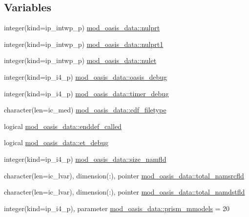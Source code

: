 \subsection*{Variables}
\begin{DoxyCompactItemize}
\item 
integer(kind=ip\+\_\+intwp\+\_\+p) \hyperlink{namespacemod__oasis__data_af0f17b70f48598dac24f2e41ca0da4b2}{mod\+\_\+oasis\+\_\+data\+::nulprt}
\item 
integer(kind=ip\+\_\+intwp\+\_\+p) \hyperlink{namespacemod__oasis__data_a2b9f5c72f10178df0bda39000b151d24}{mod\+\_\+oasis\+\_\+data\+::nulprt1}
\item 
integer(kind=ip\+\_\+intwp\+\_\+p) \hyperlink{namespacemod__oasis__data_a673f1cdeb400a5e3460a065310a492a1}{mod\+\_\+oasis\+\_\+data\+::nulet}
\item 
integer(kind=ip\+\_\+i4\+\_\+p) \hyperlink{namespacemod__oasis__data_a51f2f4f66476cf893f2507722cd65958}{mod\+\_\+oasis\+\_\+data\+::oasis\+\_\+debug}
\item 
integer(kind=ip\+\_\+i4\+\_\+p) \hyperlink{namespacemod__oasis__data_a320a34357de5c3049ccf102df7b97f5e}{mod\+\_\+oasis\+\_\+data\+::timer\+\_\+debug}
\item 
character(len=ic\+\_\+med) \hyperlink{namespacemod__oasis__data_adf52e0e1baededb92201f7592811d00d}{mod\+\_\+oasis\+\_\+data\+::cdf\+\_\+filetype}
\item 
logical \hyperlink{namespacemod__oasis__data_a5341a9152ef540667f7fcaa4f04c6399}{mod\+\_\+oasis\+\_\+data\+::enddef\+\_\+called}
\item 
logical \hyperlink{namespacemod__oasis__data_aaffd695f4c3185d0ac798d0b63fe612c}{mod\+\_\+oasis\+\_\+data\+::et\+\_\+debug}
\item 
integer(kind=ip\+\_\+i4\+\_\+p) \hyperlink{namespacemod__oasis__data_aa8588b3be582de7f61aa318d45854483}{mod\+\_\+oasis\+\_\+data\+::size\+\_\+namfld}
\item 
character(len=ic\+\_\+lvar), dimension(\+:), pointer \hyperlink{namespacemod__oasis__data_a58b5a440f274f5dfb942d7e18f12674c}{mod\+\_\+oasis\+\_\+data\+::total\+\_\+namsrcfld}
\item 
character(len=ic\+\_\+lvar), dimension(\+:), pointer \hyperlink{namespacemod__oasis__data_a81466361b20004007f221dd6a32041f9}{mod\+\_\+oasis\+\_\+data\+::total\+\_\+namdstfld}
\item 
integer(kind=ip\+\_\+i4\+\_\+p), parameter \hyperlink{namespacemod__oasis__data_a11c61975c048981f7e508f1b6caf16b6}{mod\+\_\+oasis\+\_\+data\+::prism\+\_\+mmodels} = 20

\end{DoxyCompactItemize}
